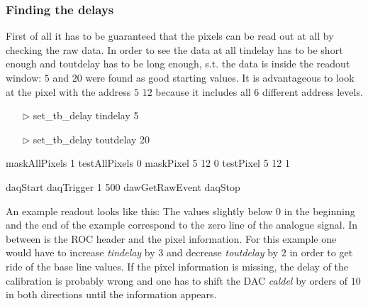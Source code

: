 \documentclass[british,11pt,a4paper]{memoir}
\begin{document}
\subsubsection{Finding the delays}
First of all it has to be guaranteed that the pixels can be read out at all by checking the raw data. In order to see the data at all tindelay has to be short enough and toutdelay has to be long enough, s.t. the data is inside the readout window: $5$ and $20$ were found as good starting values. It is advantageous to look at the pixel with the address $5$ $12$ because it includes all $6$ different address levels.\s
\begin{minipage}{5.5cm}
	\begin{itemize}\ubuntu
		\item[$\triangleright$] set\_tb\_delay tindelay 5
		\item[$\triangleright$] set\_tb\_delay toutdelay 20
	\end{itemize}
\end{minipage}
\no\s
\begin{minipage}{4.2cm}
	\begin{itemize}\ubuntu
		\tri maskAllPixels 1
		\tri testAllPixels 0
		\tri maskPixel 5 12 0
		\tri testPixel 5 12 1
	\end{itemize}
\end{minipage}
\no\s
\begin{minipage}{4.2cm}
	\begin{itemize}\ubuntu
		\tri daqStart 
		\tri daqTrigger 1 500
		\tri dawGetRawEvent
		\tri daqStop
	\end{itemize}
\end{minipage}
\no\s
An example readout looks like this:
\termi{[-3, -19, -9, -193, -1, 96, -55, 58, 108, 164, 212, 93, -4, -6]}
The values slightly below $0$ in the beginning and the end of the example correspond to the zero line of the analogue signal. In between is the \ac{ROC} header and the pixel information. For this example one would have to increase \textit{tindelay} by $3$ and decrease \textit{toutdelay} by $2$ in order to get ride of the base line values. If the pixel information is missing, the delay of the calibration is probably wrong and one has to shift the \ac{DAC} \textit{caldel} by orders of $10$ in both directions until the information appears.
\end{document}
